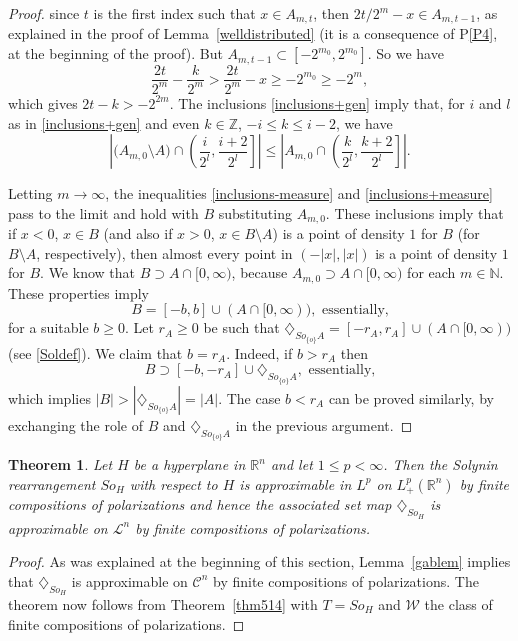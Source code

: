 \documentclass[12pt,reqno]{amsart}
\newcommand{\N}{{\mathbb N}}
\newcommand{\R}{{\mathbb R}}
\newcommand{\Z}{{\mathbb Z}}
\newcommand{\cW}{{\mathcal W}}
\newtheorem{thm}{Theorem}[section]
\newcommand{\di}{\diamondsuit}
\numberwithin{equation}{section}
\begin{document}
\begin{proof}
since  $t$ is the first index such that $x\in A_{m,t}$, then $2t/2^m-x\in A_{m,t-1}$, as explained in the proof of Lemma~\ref{welldistributed} (it is a consequence of P\ref{P4}, at the beginning of the proof). But $A_{m,t-1}\subset[-2^{m_0}, 2^{m_0}]$. So we have
\[
\frac{2t}{2^m}-\frac{k}{2^m}>\frac{2t}{2^m}-x\geq -2^{m_0}\geq -2^m,
\]
which gives $2t-k>-2^{2m}$.  The inclusions \eqref{inclusions+gen} imply that, for $i$ and $l$ as in \eqref{inclusions+gen} and even $k\in\Z$, $-i\leq k\leq i-2$, we have
\begin{equation}\label{inclusions+measure}
 \left| \big(A_{m,0}\setminus A\big)\cap\left(\frac{i}{2^l},\frac{i+2}{2^l}\right]\right|
 \leq \left|A_{m,0}\cap\left(\frac{k}{2^l},\frac{k+2}{2^l}\right]\right|.
\end{equation}

Letting $m\to \infty$, the inequalities \eqref{inclusions-measure} and \eqref{inclusions+measure} pass to the limit and hold with $B$ substituting $A_{m,0}$. These inclusions imply that if $x<0$, $x\in B$ (and also if $x>0$, $x\in B\setminus A$)  is a point of density $1$ for $B$ (for $B\setminus A$, respectively),  then almost every point in $(-|x|, |x|)$ is a point of density $1$ for $B$. We know that $B\supset A\cap[0,\infty)$, because  $A_{m,0}\supset A\cap[0,\infty)$ for each $m\in\N$. These properties imply
\[
 B=[-b,b]\cup(A\cap[0,\infty)), \text{ essentially,}
\]
for a suitable $b\geq0$. Let $r_A\geq0$ be such that $\di_{So_{\{o\}} A}=[-r_A,r_A]\cup (A\cap[0,\infty))$ (see \eqref{Soldef}).  We claim that $b=r_A$. Indeed, if $b>r_A$ then
$$
 B\supset [-b, -r_A]\cup \di_{So_{\{o\}} A}, \text{ essentially,}
$$
which implies $|B|>|\di_{So_{\{o\}} A}|=|A|$. The case $b<r_A$ can be proved similarly, by exchanging the role of $B$ and $\di_{So_{\{o\}} A}$ in the previous argument.
\end{proof}

\begin{thm}\label{gabcor}
Let $H$ be a hyperplane in $\R^n$ and let $1\le p<\infty$. Then the Solynin rearrangement $So_H$ with respect to $H$ is approximable in $L^p$ on $L^p_+(\R^n)$ by finite compositions of polarizations and hence the associated set map $\di_{So_H}$ is approximable on ${\mathcal{L}}^n$ by finite compositions of polarizations.
\end{thm}

\begin{proof}
As was explained at the beginning of this section, Lemma~\ref{gablem} implies that $\di_{So_H}$ is approximable on ${\mathcal{C}}^n$ by finite compositions of polarizations.  The theorem now follows from Theorem~\ref{thm514} with $T=So_H$ and $\cW$ the class of finite compositions of polarizations.
\end{proof}
\end{document}
